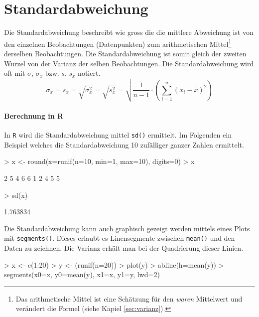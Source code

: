 \section{Standardabweichung}
Die \gls{Standardabweichung} beschreibt wie gross die die mittlere 
Abweichung ist von den einzelnen Beobachtungen (Datenpunkten) zum 
arithmetischen Mittel\footnote{Das arithmetische Mittel ist eine 
Schätzung für den
\emph{waren} Mittelwert und verändert die Formel 
(siehe Kapiel \ref{sec:varianz}).} 
derselben Beobachtungen. Die Standardabweichung ist somit gleich
der zweiten Wurzel von der Varianz der selben Beobachtungen. Die
Standardabweichung wird oft mit $\sigma$, $\sigma_x$ bzw. $s$, $s_x$ 
notiert.
\[
	\sigma_x 
	= s_x 
	= \sqrt{\sigma_{x}^2}
	= \sqrt{s_{x}^2}
	= \sqrt{\frac{1}{n-1} \cdot \left(
		\sum_{i=1}^n (x_i-\bar{x})^2 
	\right)}
\]

\paragraph{Berechnung in R}
In \lstinline{R} wird die Standardabweichung mittel \lstinline{sd()}
ermittelt. Im Folgenden ein Beispiel welches die Standardabweichung
10 zufälliger ganzer Zahlen ermittelt.
\begin{Schunk}
\begin{Sinput}
> x <- round(x=runif(n=10, min=1, max=10), digits=0)
> x
\end{Sinput}
\begin{Soutput}
 [1] 2 5 4 6 6 1 2 4 5 5
\end{Soutput}
\begin{Sinput}
> sd(x)
\end{Sinput}
\begin{Soutput}
[1] 1.763834
\end{Soutput}
\end{Schunk}
Die Standardabweichung kann auch graphisch gezeigt werden mittels
eines Plots mit \lstinline{segments()}. Dieses erlaubt es Linensegmente
zwischen \lstinline{mean()} und den Daten zu zeichnen. Die Varianz
erhält man bei der Quadrierung dieser Linien.
\begin{Schunk}
\begin{Sinput}
> x <- c(1:20)
> y <- (runif(n=20))
> plot(y)
> abline(h=mean(y))
> segments(x0=x, y0=mean(y), x1=x, y1=y, lwd=2)
\end{Sinput}
\end{Schunk}


